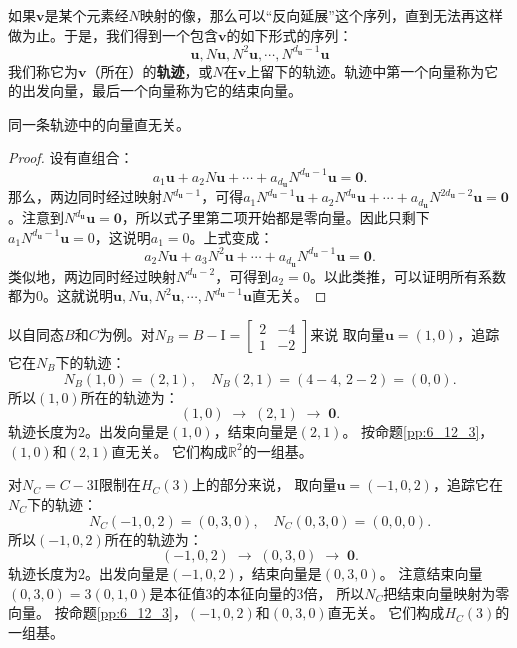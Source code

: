 \documentclass[12pt,UTF8,fontset=none]{ctexbook}
\begin{document}
如果$\mathbf{v}$是某个元素经$N$映射的像，那么可以“反向延展”这个序列，直到无法再这样做为止。于是，我们得到一个包含$\mathbf{v}$的如下形式的序列：
$$ \mathbf{u}, N\mathbf{u}, N^2 \mathbf{u}, \cdots , N^{d_\mathbf{u} - 1} \mathbf{u} $$
我们称它为$\mathbf{v}$（所在）的\textbf{轨迹}，或$N$在$\mathbf{v}$上留下的轨迹。轨迹中第一个向量称为它的出发向量，最后一个向量称为它的结束向量。
\begin{pp}\label{pp:6_12_3}
    同一条轨迹中的向量直无关。
\end{pp}
\begin{proof} %
设有直组合：
$$ a_1 \mathbf{u} + a_2 N\mathbf{u} +\cdots + a_{d_\mathbf{u}} N^{d_\mathbf{u} - 1} \mathbf{u} = \mathbf{0}.$$
那么，两边同时经过映射$N^{d_\mathbf{u} - 1}$，可得$a_1 N^{d_\mathbf{u} - 1}\mathbf{u} + a_2 N^{d_\mathbf{u}}\mathbf{u} +\cdots + a_{d_\mathbf{u}} N^{2d_\mathbf{u} - 2} \mathbf{u} = \mathbf{0}$。注意到$N^{d_\mathbf{u}}\mathbf{u}= \mathbf{0}$，所以式子里第二项开始都是零向量。因此只剩下$a_1 N^{d_\mathbf{u} - 1}\mathbf{u} = 0$，这说明$a_1 = 0$。上式变成：
$$ a_2 N\mathbf{u} + a_3 N^2\mathbf{u} +\cdots + a_{d_\mathbf{u}} N^{d_\mathbf{u} - 1} \mathbf{u} = \mathbf{0}. $$
类似地，两边同时经过映射$N^{d_\mathbf{u} - 2}$，可得到$a_2 = 0$。以此类推，可以证明所有系数都为0。这就说明$\mathbf{u}, N\mathbf{u}, N^2 \mathbf{u}, \cdots , N^{d_\mathbf{u} - 1} \mathbf{u}$直无关。

\end{proof}

以自同态$B$和$C$为例。对$N_B = B - \mathrm{I} = \begin{bmatrix} 2 & -4 \\ 1 & -2 \end{bmatrix}$来说
取向量$\mathbf{u} = (1,0)$，追踪它在$N_B$下的轨迹：
$$
N_B(1,0) = (2, 1), \quad N_B(2,1) = (4-4,\, 2-2) = (0,0).
$$
所以$(1,0)$所在的轨迹为：
$$
(1,0) \;\longrightarrow\; (2,1) \;\longrightarrow\; \mathbf{0}.
$$
轨迹长度为$2$。出发向量是$(1,0)$，结束向量是$(2,1)$。
按命题\ref{pp:6_12_3}，$(1,0)$和$(2,1)$直无关。
它们构成$\mathbb{R}^2$的一组基。

对$N_C = C - 3\mathrm{I}$限制在$H_C(3)$上的部分来说，
取向量$\mathbf{u} = (-1, 0, 2)$，追踪它在$N_C$下的轨迹：
$$
N_C(-1,0,2) = (0, 3, 0), \quad N_C(0,3,0) = (0, 0, 0).
$$
所以$(-1,0,2)$所在的轨迹为：
$$
(-1,0,2) \;\longrightarrow\; (0,3,0) \;\longrightarrow\; \mathbf{0}.
$$
轨迹长度为$2$。出发向量是$(-1,0,2)$，结束向量是$(0,3,0)$。
注意结束向量$(0,3,0) = 3(0,1,0)$是本征值$3$的本征向量的$3$倍，
所以$N_C$把结束向量映射为零向量。
按命题\ref{pp:6_12_3}，$(-1,0,2)$和$(0,3,0)$直无关。
它们构成$H_C(3)$的一组基。
\end{document}
